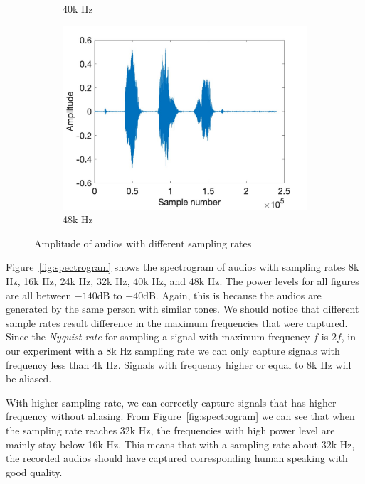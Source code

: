 \documentclass[11pt, oneside]{article}   	%
\begin{document}
\begin{figure}[ht]
\begin{subfigure}[b]{0.3\textwidth}
\caption{40k Hz}
\end{subfigure}
\begin{subfigure}[b]{0.3\textwidth}
\includegraphics[width=\textwidth]{imgs/48k-amplitude.jpg}
\caption{48k Hz}
\end{subfigure}

\caption{Amplitude of audios with different sampling rates}
\label{fig:amplitude}
\end{figure}

Figure~\ref{fig:spectrogram} shows the spectrogram of audios with sampling rates 8k Hz, 16k Hz, 24k Hz, 32k Hz, 40k Hz, and 48k Hz. The power levels for all figures are all between $-140$dB to $-40$dB. Again, this is because the audios are generated by the same person with similar tones. We should notice that different sample rates result difference in the maximum frequencies that were captured. Since the \emph{Nyquist rate} for sampling a signal with maximum frequency $f$ is $2f$, in our experiment with a 8k Hz sampling rate we can only capture signals with frequency less than 4k Hz. Signals with frequency higher or equal to 8k Hz will be aliased. 

With higher sampling rate, we can correctly capture signals that has higher frequency without aliasing. From Figure~\ref{fig:spectrogram} we can see that when the sampling rate reaches 32k Hz, the frequencies with high power level are mainly stay below 16k Hz. This means that with a sampling rate about 32k Hz, the recorded audios should have captured corresponding human speaking with good quality.
\end{document}
